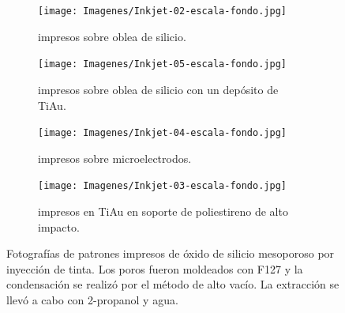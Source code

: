   			\begin{figure}[b!]
			 	   	    \centering
			 	   	    \begin{subfigure}[t]{0.495\textwidth}
			        	\texttt{[image: Imagenes/Inkjet-02-escala-fondo.jpg]}
			        	\caption{\pdmF\space impresos sobre oblea de silicio.}
			       		\end{subfigure}
			     		\centering
			     		\begin{subfigure}[t]{0.495\textwidth}
			     		\texttt{[image: Imagenes/Inkjet-05-escala-fondo.jpg]}
			    		\caption{\pdmF\space impresos sobre oblea de silicio con un depósito de Ti\textbar Au.}
			    		\end{subfigure}
			    		\centering
			    		\begin{subfigure}[t]{0.495\textwidth}
			         	\texttt{[image: Imagenes/Inkjet-04-escala-fondo.jpg]}
			        	\caption{\pdmF\space impresos sobre microelectrodos.}
			        	\end{subfigure}
			        	\centering
			        	\begin{subfigure}[t]{0.495\textwidth}
			     		\texttt{[image: Imagenes/Inkjet-03-escala-fondo.jpg]}
 			        	\caption{\pdmF\space impresos en Ti\textbar	Au en soporte de poliestireno de alto impacto.}
			        	\end{subfigure}
			     		\caption[Electrodos impresos]{Fotografías de patrones impresos de óxido de silicio mesoporoso por inyección de tinta. Los poros fueron moldeados con F127 y la condensación se realizó por el método de alto vacío. La extracción se llevó a cabo con 2-propanol y agua.}
			     		\label{fig:flexibles}
			     	   	\end{figure}

